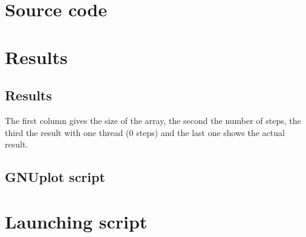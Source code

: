 \chapter{Source code}



\chapter{Results}

\section{Results}
The first column gives the size of the array, the second the number of steps, the third the result with one thread (0 steps) and the last one shows the actual result.


\section{GNUplot script}
\lstset{language=Gnuplot}


\chapter{Launching script}

\lstset{language=Ruby}

